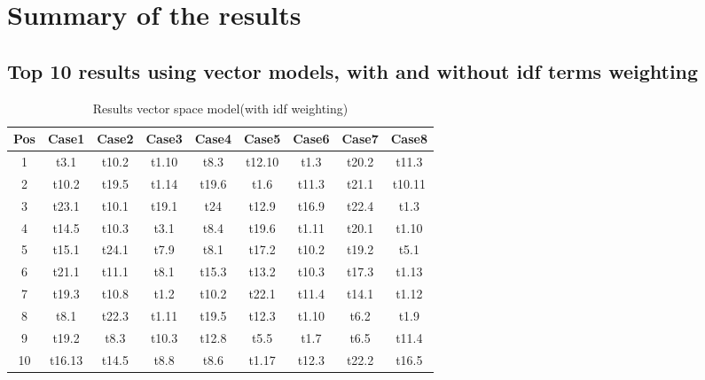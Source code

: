 \chapter{Summary of the results}

\section{Top 10 results using vector models, with and without idf terms weighting}

\begin{table}[h!]
\begin{center}
\begin{tabular}{ | c c c c c c c c c | }
\hline
\textbf{Pos} & \textbf{Case1} & \textbf{Case2} & \textbf{Case3} & \textbf{Case4} & \textbf{Case5} & \textbf{Case6} & \textbf{Case7} & \textbf{Case8} \\ \hline
1 & t3.1 & t10.2 & t1.10 & t8.3 & t12.10 & t1.3 & t20.2 & t11.3 \\
2 & t10.2 & t19.5 & t1.14 & t19.6 & t1.6 & t11.3 & t21.1 & t10.11 \\
3 & t23.1 & t10.1 & t19.1 & t24 & t12.9 & t16.9 & t22.4 & t1.3 \\
4 & t14.5 & t10.3 & t3.1 & t8.4 & t19.6 & t1.11 & t20.1 & t1.10 \\
5 & t15.1 & t24.1 & t7.9 & t8.1 & t17.2 & t10.2 & t19.2 & t5.1 \\
6 & t21.1 & t11.1 & t8.1 & t15.3 & t13.2 & t10.3 & t17.3 & t1.13 \\
7 & t19.3 & t10.8 & t1.2 & t10.2 & t22.1 & t11.4 & t14.1 & t1.12 \\
8 & t8.1 & t22.3 & t1.11 & t19.5 & t12.3 & t1.10 & t6.2 & t1.9 \\
9 & t19.2 & t8.3 & t10.3 & t12.8 & t5.5 & t1.7 & t6.5 & t11.4 \\
10 & t16.13 & t14.5 & t8.8 & t8.6 & t1.17 & t12.3 & t22.2 & t16.5 \\
\hline
\end{tabular}
\end{center}
\caption{Results vector space model(with idf weighting)}
\end{table}

